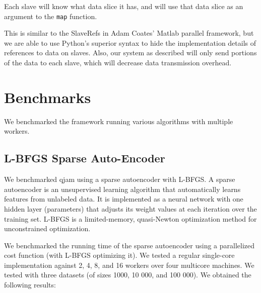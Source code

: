 \documentclass[%
  final,
  notitlepage,
  narroweqnarray,
  inline,
]{ieee}
\begin{document}
Each slave will know what data slice it has, and will use that data slice as an
argument to the {\tt map} function.

This is similar to the SlaveRefs in Adam Coates' Matlab parallel framework, but
we are able to use Python's superior syntax to hide the implementation details
of references to data on slaves. Also, our system as described will only send
portions of the data to each slave, which will decrease data transmission
overhead.

\section{Benchmarks}

We benchmarked the framework running various algorithms with multiple workers.

\subsection{L-BFGS Sparse Auto-Encoder}

We benchmarked qjam using a sparse autoencoder with L-BFGS. A sparse
autoencoder is an unsupervised learning algorithm that automatically learns
features from unlabeled data. It is implemented as a neural network with one
hidden layer (parameters) that adjusts its weight values at each iteration over
the training set. L-BFGS is a limited-memory, quasi-Newton optimization method
for unconstrained optimization.

We benchmarked the running time of the sparse autoencoder using a parallelized
cost function (with L-BFGS optimizing it). We tested a regular single-core
implementation against 2, 4, 8, and 16 workers over four multicore machines. We
tested with three datasets (of sizes 1000, 10 000, and 100 000). We obtained
the following results:
\end{document}

